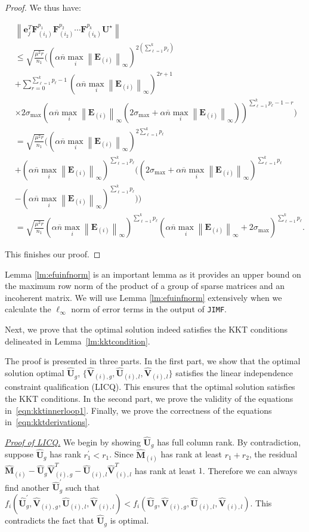 \documentclass[twoside,11pt]{article}
\def\inneralg{\texttt{JIMF}\xspace}
\newcommand{\norm}[1]{\left\lVert#1\right\rVert}
\newcommand{\matE}{\mathbf{E}}
\newcommand{\matF}{\mathbf{F}}
\newcommand{\matUst}{{\mathbf{U}^\star}}
\newcommand{\hmatM}{\hat{\mathbf{M}}}
\newcommand{\hmatU}{\hat{\mathbf{U}}}
\newcommand{\hmatV}{\hat{\mathbf{V}}}
\newcommand{\vece}{\mathbf{e}}
\newcommand{\gop}{\sigma_{\max}}
\newcommand{\bn}{{\overline{n}}}
\newcommand{\abnb}{\alpha \bn\max_{i}\norm{\matE_{(i)}}_{\infty}}
\newcommand{\murnone}{\frac{\mu^2 r}{n_1}}
\begin{document}
\begin{proof}
We thus have:

\begin{align*}
&\norm{\vece_j^T\matF_{(i_1)}^{p_1}\matF_{(i_2)}^{p_2}\cdots\matF_{(i_k)}^{p_k}\matUst}\\
&\le \sqrt{\murnone}\Big(\left(\abnb\right)^{2(\sum_{\ell=1}^kp_{\ell})}\\
&+\sum_{r=0}^{\sum_{\ell=1}^kp_{\ell}-1}\left(\abnb\right)^{2r+1}\\
&\times2\gop\left(\abnb\left(2\gop+\abnb\right)\right)^{\sum_{\ell=1}^kp_{\ell}-1-r}\Big)\\
&=\sqrt{\murnone}\Big(\left(\abnb\right)^{2\sum_{\ell=1}^kp_{\ell}}\\
&+\left(\abnb\right)^{\sum_{\ell=1}^kp_{\ell}}\Big(\left(2\gop+\abnb\right)^{\sum_{\ell=1}^kp_{\ell}}\\
&-\left(\abnb\right)^{\sum_{\ell=1}^kp_{\ell}}\big)\Big)\\
&=\sqrt{\murnone}\left(\abnb\right)^{\sum_{\ell=1}^kp_{\ell}}\left(\abnb+2\gop\right)^{\sum_{\ell=1}^kp_{\ell}}.
\end{align*}


This finishes our proof.
\end{proof}

Lemma \ref{lm:efuinfnorm} is an important lemma as it provides an upper bound on the maximum row norm of the product of a group of sparse matrices and an incoherent matrix. We will use Lemma \ref{lm:efuinfnorm} extensively when we calculate the $\ell_{\infty}$ norm of error terms in the output of \inneralg.

Next, we prove that the optimal solution indeed satisfies the KKT conditions delineated in Lemma~\ref{lm:kktcondition}.

\quad
The proof is presented in three parts. In the first part, we show that the optimal solution optimal $\hmatU_g$, $\{\hmatV_{(i),g},\hmatU_{(i),l},\hmatV_{(i),l}\}$ satisfies the linear independence constraint qualification (LICQ). This ensures that the optimal solution satisfies the KKT conditions. In the second part, we prove the validity of the equations in~\eqref{eqn:kktinnerloop1}. Finally, we prove the correctness of the equations in~\eqref{eqn:kktderivations}.

\noindent \underline{\it Proof of LICQ.} 
We begin by showing $\hmatU_g$ has full column rank. By contradiction, suppose $\hmatU_g$ has rank $r_1^{'}<r_1$. Since $\hmatM_{(i)}$ has rank at least $r_1+r_2$, the residual $\hmatM_{(i)}-\hmatU_g\hmatV_{(i),g}^T-\hmatU_{(i),l}\hmatV_{(i),l}^T$ has rank at least $1$. Therefore we can always find another $\hmatU_g^{'}$ such that $f_i(\hmatU_g^{'},\hmatV_{(i),g},\hmatU_{(i),l},\hmatV_{(i),l})< f_i(\hmatU_g,\hmatV_{(i),g},\hmatU_{(i),l},\hmatV_{(i),l})$. This contradicts the fact that $\hmatU_g$ is optimal.
\end{document}

